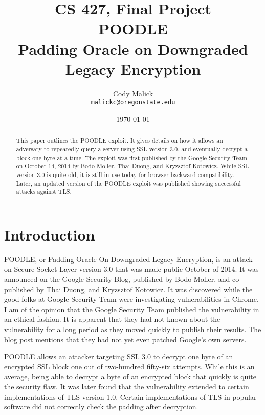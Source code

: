 \documentclass[10pt]{article}
\begin{document}
\title{CS 427, Final Project\\ POODLE\\ Padding Oracle on Downgraded Legacy
Encryption}
\author{Cody Malick\\
\texttt{malickc@oregonstate.edu}}
\date{\today}
\maketitle
\vspace{4cm}

\begin{abstract}
	This paper outlines the POODLE exploit. It gives details on how it
	allows an adversary to repeatedly query a server using SSL version 3.0,
	and eventually decrypt a block one byte at a time. The exploit was
	first published by the
	Google Security Team on October 14, 2014 by Bodo Moller, Thai Duong,
	and Kryzsztof Kotowicz. While SSL version 3.0 is quite old, it is still
	in use today for browser backward compatibility. Later, an updated
	version of the POODLE exploit was published showing successful attacks
	against TLS.

\end{abstract}

\clearpage

\section*{Introduction}
POODLE, or Padding Oracle On Downgraded Legacy Encryption, 
is an attack on Secure Socket Layer version 3.0 that was made public
October of 2014. It was announced on the Google Security Blog, published by
Bodo Moller, and co-published by Thai Duong, and Kryzsztof Kotowicz. It was
discovered while the good folks at Google Security Team were investigating
vulnerabilities in Chrome. I am of the opinion that the Google Security Team
published the vulnerability in an ethical fashion. It is apparent that they had
not known about the vulnerability for a long period as they moved quickly to
publish their results. The blog post mentions that they had not yet even
patched Google's own servers. \cite{googlesec}

POODLE allows an attacker targeting SSL 3.0 to decrypt one byte of an encrypted
SSL block one out of two-hundred fifty-six attempts. While this is an average,
being able to decrypt a byte of an encrypted block that quickly is quite the
security flaw.\cite{POODLE} It was later found that the vulnerability extended
to certain implementations of TLS version 1.0. Certain implementations of TLS in
popular software did not correctly check the padding after decryption. \cite{POODLEBites}
\end{document}
